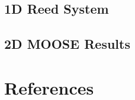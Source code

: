 \documentclass[review]{elsarticle}
\begin{document}
\subsection{1D Reed System}

\subsection{2D MOOSE Results}


\section*{References}



\end{document}
